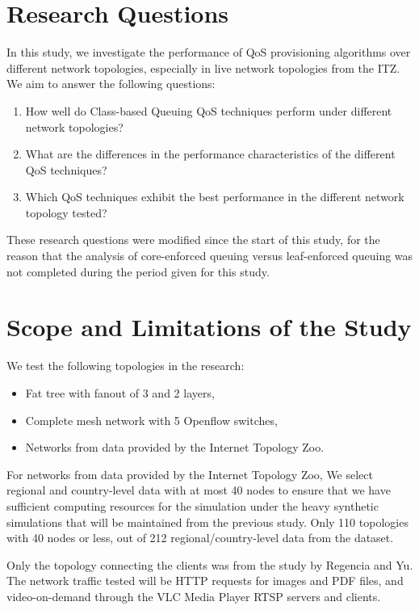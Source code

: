 \section{Research Questions}
In this study, we investigate the performance of QoS provisioning algorithms over different network topologies, especially in live network topologies from the ITZ. We aim to answer the following questions:

\begin{enumerate}
    \item How well do Class-based Queuing QoS techniques perform under different network topologies?
    \item What are the differences in the performance characteristics of the different QoS techniques?
    \item Which QoS techniques exhibit the best performance in the different network topology tested?
\end{enumerate}

These research questions were modified since the start of this study, for the reason that the analysis of core-enforced queuing versus leaf-enforced queuing was not completed during the period given for this study.

\section{Scope and Limitations of the Study}

We test the following topologies in the research:
\begin{itemize}
    \item Fat tree with fanout of 3 and 2 layers,
    \item Complete mesh network with 5 Openflow switches,
    \item Networks from data provided by the Internet Topology Zoo.
\end{itemize}

For networks from data provided by the Internet Topology Zoo, We select regional and country-level data with at most 40 nodes to ensure that we have sufficient computing resources for the simulation under the heavy synthetic simulations that will be maintained from the previous study. Only 110 topologies with 40 nodes or less, out of 212 regional/country-level data from the dataset. 

Only the topology connecting the clients was from the study by Regencia and Yu. The network traffic tested will be HTTP requests for images and PDF files, and video-on-demand through the VLC Media Player RTSP servers and clients.
    
